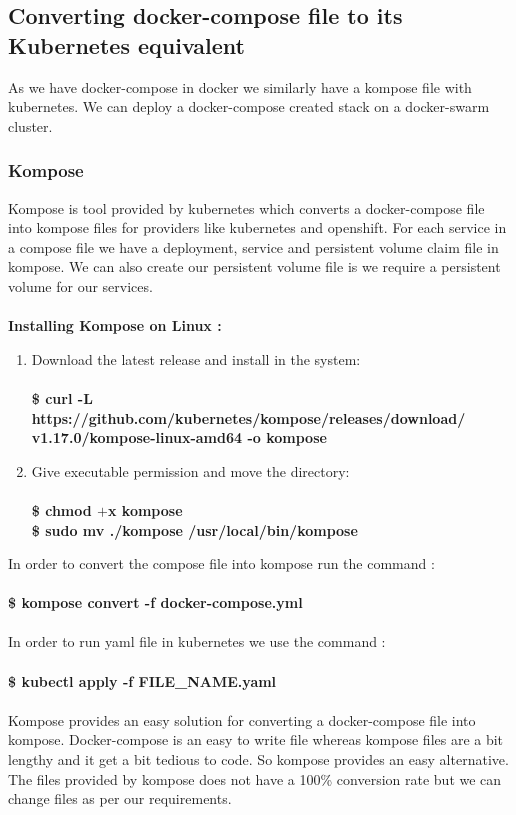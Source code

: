 \documentclass[12pt]{report}
\begin{document}
\subsection{Converting docker-compose file to its Kubernetes equivalent}
As we have docker-compose in docker we similarly have a kompose file with kubernetes. We can deploy a docker-compose created stack on a docker-swarm cluster. 
\subsubsection{Kompose}
Kompose is tool provided by kubernetes which converts a docker-compose file into kompose files for providers like kubernetes and openshift. For each service in a compose file we have a deployment, service and persistent volume claim file in kompose. We can also create our persistent volume file is we require a persistent volume for our services.\\\\
\textbf{Installing Kompose on Linux :}
\begin{enumerate}
	\item Download the latest release and install in the system:\\\\
	\textbf{\$ curl -L https://github.com/kubernetes/kompose/releases/download/\\v1.17.0/kompose-linux-amd64 -o kompose}
	\item Give executable permission and move the directory:\\\\
	\textbf{\$ chmod $+$x kompose\\
		\$ sudo mv ./kompose /usr/local/bin/kompose}
\end{enumerate}
In order to convert the compose file into kompose run the command :\\\\
\textbf{\$ kompose convert -f docker-compose.yml}\\\\
In order to run yaml file in kubernetes we use the command :\\\\
\textbf{\$ kubectl apply -f FILE\_NAME.yaml}\\\\
Kompose provides an easy solution for  converting a docker-compose file into kompose. Docker-compose is an easy to write file whereas kompose files are a bit lengthy and it get a bit tedious to code. So kompose provides an easy alternative. The files provided by kompose does not have a 100\% conversion rate but we can change files as per our requirements.\\\\
\end{document}
